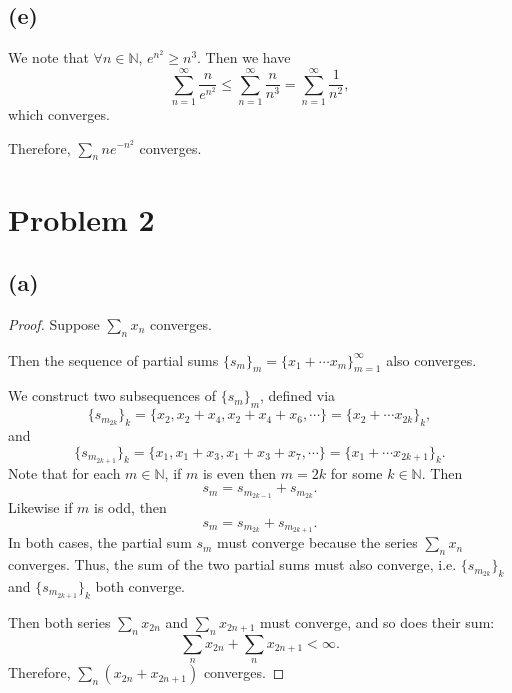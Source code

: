 \documentclass{article}
\begin{document}
\subsection*{(e)}
We note that $\forall n \in \mathbb{N}$, $e^{n^2} \geq n^3$. Then we have
\begin{equation}
	\sum_{n=1}^{\infty}\frac{n}{e^{n^2}} \leq \sum_{n=1}^{\infty} \frac{n}{n^3} = \sum_{n=1}^{\infty}\frac{1}{n^2}, 
\end{equation}
which converges. 

Therefore, $\sum_n ne^{-n^2}$ converges.
\section*{Problem 2}
\subsection*{(a)}
\begin{proof}
	Suppose $\sum_n x_n$ converges. 
	
	Then the sequence of partial sums $\{s_m\}_m = \{x_1 + \cdots x_m\}_{m=1}^{\infty}$ also converges. 
	
	We construct two subsequences of $\{s_m\}_m$, defined via
	\begin{equation}
		\{s_{m_{2k}}\}_k = \{x_2, x_2 + x_4, x_2 + x_4 + x_6, \cdots\} = \{x_2 + \cdots x_{2k}\}_k,
	\end{equation}
	and
	\begin{equation}
		\{s_{m_{2k+1}}\}_k = \{x_1, x_1 + x_3, x_1 + x_3 + x_7, \cdots\} = \{x_1 + \cdots x_{2k+1}\}_k.
	\end{equation}
	Note that for each $m\in\mathbb{N}$, if $m$ is even then $m=2k$ for some $k\in\mathbb{N}$. Then
	\begin{equation}
		s_m = s_{m_{2k-1}} + s_{m_{2k}}.
	\end{equation}
	Likewise if $m$ is odd, then
	\begin{equation}
		s_m = s_{m_{2k}} + s_{m_{2k+1}}.
	\end{equation}
	In both cases, the partial sum $s_m$ must converge because the series $\sum_n x_n$ converges. Thus, the sum of the two partial sums must also converge, i.e. $\{s_{m_{2k}}\}_k$ and $\{s_{m_{2k+1}}\}_k$ both converge. 
	
	Then both series $\sum_n x_{2n}$ and $\sum_n x_{2n+1}$ must converge, and so does their sum:
	\begin{equation}
		\sum_n x_{2n} + \sum_n x_{2n+1} < \infty.
	\end{equation}
	Therefore, $\sum_n \left(x_{2n} + x_{2n+1}\right)$ converges.
\end{proof}
\end{document}
